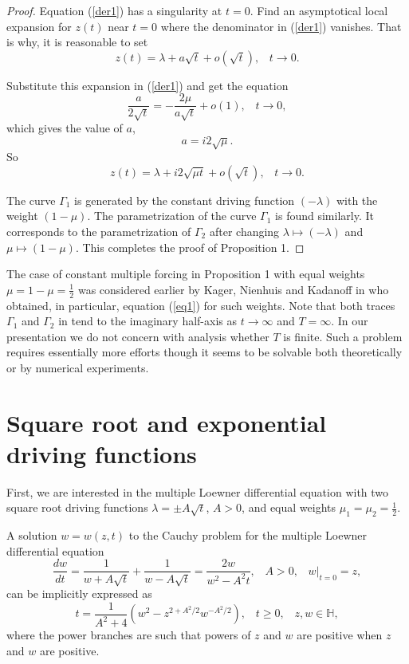 \documentclass[
11pt,%
tightenlines,%
twoside,%
onecolumn,%
nofloats,%
nobibnotes,%
nofootinbib,%
superscriptaddress,%
noshowpacs,%
centertags]%
{revtex4}
\begin{document}
\begin{proof}
Equation (\ref{der1}) has a singularity at $t=0$. Find an asymptotical local expansion for $z(t)$ near $t=0$ where the denominator in (\ref{der1}) vanishes. That is why, it is reasonable to set $$z(t)=\lambda+a\sqrt t+o(\sqrt t),\;\;\;t\to0.$$

Substitute this expansion in (\ref{der1}) and get the equation $$\frac{a}{2\sqrt t}=-\frac{2\mu}{a\sqrt t}+o(1),\;\;\;t\to0,$$ which gives the value of $a$, $$a=i2\sqrt{\mu}.$$ So $$z(t)=\lambda+i2\sqrt{\mu t}+ o(\sqrt t),\;\;\;t\to0.$$

The curve $\Gamma_1$ is generated by the constant driving function $(-\lambda)$ with the weight $(1-\mu)$. The parametrization of the curve $\Gamma_1$ is found similarly. It corresponds to the parametrization of $\Gamma_2$ after changing $\lambda\mapsto(-\lambda)$ and $\mu\mapsto(1-\mu)$. This completes the proof of Proposition 1.
\end{proof}

The case of constant multiple forcing in Proposition 1 with equal weights $\mu=1-\mu=\frac{1}{2}$ was considered earlier by Kager, Nienhuis and Kadanoff in \cite{KagNieKad} who obtained, in particular, equation (\ref{eq1}) for such weights. Note that both traces $\Gamma_1$ and $\Gamma_2$ in \cite{KagNieKad} tend to the imaginary half-axis as $t\to\infty$ and $T=\infty$. In our presentation we do not concern with analysis whether $T$ is finite. Such a problem requires essentially more efforts though it seems to be solvable both theoretically or by numerical experiments.

\section{Square root and exponential driving functions}

First, we are interested in the multiple Loewner differential equation with two square root driving functions $\lambda=\pm A\sqrt t$, $A>0$, and equal weights $\mu_1=\mu_2=\frac{1}{2}$.

\begin{theorem} A solution $w=w(z,t)$ to the Cauchy problem for the multiple Loewner differential equation
\begin{equation}
\frac{dw}{dt}=\frac{1}{w+A\sqrt t}+\frac{1}{w-A\sqrt t}=\frac{2w}{w^2-A^2t},\;\;\;A>0,\;\;\;w|_{t=0}=z, \label{th2}
\end{equation}
can be implicitly expressed as
\begin{equation}
t=\frac{1}{A^2+4}(w^2-z^{2+A^2/2}w^{-A^2/2}),\;\;\;t\geq0,\;\;\;z,w\in\mathbb H, \label{eq2}
\end{equation}
where the power branches are such that powers of $z$ and $w$ are positive when $z$ and $w$ are positive.
\end{theorem}
\end{document}

